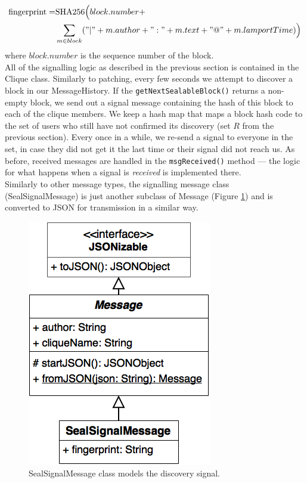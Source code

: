 \documentclass[a4paper, 12pt]{report}
\begin{document}
\begin{equation*}
    \begin{split}
    \text{fingerprint} = & \text{SHA256}\Big(block.number + \\
                        & \sum_{m \in block}("|" + m.author + ":" + m.text + "@" + m.lamportTime)\Big)
    \end{split}
\end{equation*}
where $block.number$ is the sequence number of the block. \\

All of the signalling logic as described in the previous section is contained in the Clique class. Similarly to patching, every few seconds we attempt to discover a block in our MessageHistory. If the \texttt{getNextSealableBlock()} returns a non-empty block, we send out a signal message containing the hash of this block to each of the clique members. We keep a hash map that maps a block hash code to the set of users who still have not confirmed its discovery (set $R$ from the previous section). Every once in a while, we re-send a signal to everyone in the set, in case they did not get it the last time or their signal did not reach us. As before, received messages are handled in the \texttt{msgReceived()} method --- the logic for what happens when a signal is \emph{received} is implemented there. \\

Similarly to other message types, the signalling message class (SealSignalMessage) is just another subclass of Message (Figure \ref{fig:seal_message}) and is converted to JSON for transmission in a similar way.

\begin{figure}[H]
    \captionsetup{width=0.80\textwidth}
    \centering
    \includegraphics[width=0.4\linewidth]{pics/seal_message.png}
    \caption{\label{fig:seal_message} SealSignalMessage class models the discovery signal.}
\end{figure}
\end{document}
